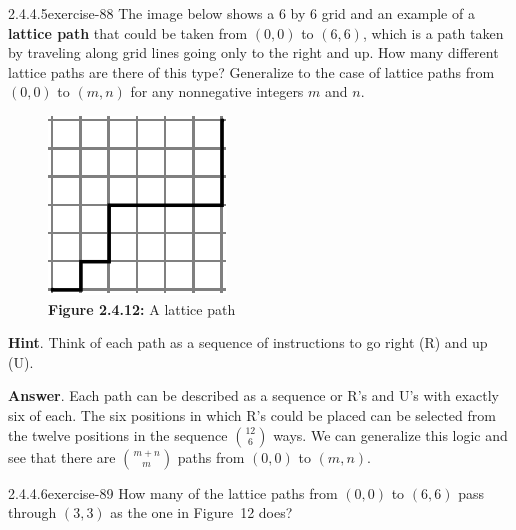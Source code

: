 \documentclass[twoside,10pt,]{book}
\newcommand{\terminology}[1]{\textbf{#1}}
\numberwithin{equation}{section}
\begin{document}
\begin{divisionsolution}{2.4.4.5}{}{exercise-88}%
\hypertarget{p-816}{}%
The image below shows a 6 by 6 grid and an example of a \terminology{lattice path} that could be taken from \((0,0)\)  to \((6,6)\), which is a path taken by traveling along grid lines going only to the right and up. How many different lattice paths are there of this type?  Generalize to the case of lattice paths from \((0,0)\) to \((m,n)\)  for any nonnegative integers \(m\) and \(n\).%
\begin{figure}
\centering
\includegraphics[width=0.5\linewidth]{images/fig-lattice-path-6.png}
\caption*{\textbf{Figure 2.4.12:} A lattice path}
\end{figure}
\par\smallskip%
\noindent\textbf{Hint}.\quad%
\hypertarget{p-817}{}%
Think of each path as a sequence of instructions to go right (R) and up (U).%
\par\smallskip%
\noindent\textbf{Answer}.\quad%
\hypertarget{p-818}{}%
Each path can be described as a sequence or R's and U's with exactly six of each.   The six positions in which R's could be placed can be selected from the twelve positions in the sequence \(\binom{12}{6}\) ways.  We can generalize this logic and see that there are \(\binom{m+n}{m}\) paths from \((0,0)\) to \((m,n)\).%
\end{divisionsolution}%
\begin{divisionsolution}{2.4.4.6}{}{exercise-89}%
\hypertarget{p-819}{}%
How many of the lattice paths from \((0,0)\) to \((6,6)\) pass through \((3,3)\) as the one in Figure~12 does?%
\end{divisionsolution}%
\end{document}
